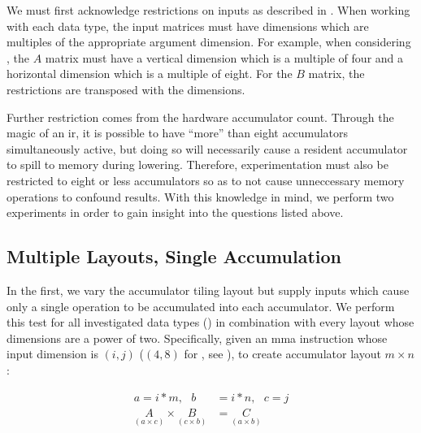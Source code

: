 \documentclass[\main/thesis.tex]{subfiles}
\begin{document}
We must first acknowledge restrictions on inputs as described in .
When working with each data type, the input matrices must have dimensions which are multiples of the appropriate argument dimension.
For example, when considering , the $A$ matrix must have a vertical dimension which is a multiple of four and a horizontal dimension which is a multiple of eight.
For the $B$ matrix, the restrictions are transposed with the dimensions.

Further restriction comes from the hardware accumulator count.
Through the magic of an \gls{ir}, it is possible to have ``more'' than eight accumulators simultaneously active, but doing so will necessarily cause a resident accumulator to \gls{spill} to memory during \gls{lowering}.
Therefore, experimentation must also be restricted to eight or less accumulators so as to not cause unneccessary memory operations to confound results.
With this knowledge in mind, we perform two experiments in order to gain insight into the questions listed above.

\subsection{Multiple Layouts, Single Accumulation}
\label{sec:mlsa}
In the first, we vary the accumulator tiling layout but supply inputs which cause only a single operation to be accumulated into each accumulator.
We perform this test for all investigated data types () in combination with every layout whose dimensions are a power of two.
Specifically, given an \gls{mma} instruction whose input dimension is $(i, j)$ (\eg $(4, 8)$ for , see ), to create accumulator layout $m \times n$:

\begin{equation}
  \begin{split}
    a = i * m, \text{ } b &= i * n, \text{ } c = j\\
    \underset{(a \times c)}{A} \times \underset{(c \times b)}{B} &= \underset{(a \times b)}{C}
  \end{split}
\end{equation}
\end{document}
